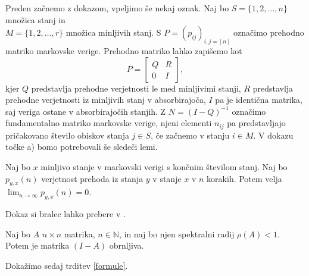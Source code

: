 \documentclass[twoside,11pt]{article}
\begin{document}
\noindent
Preden začnemo z dokazom, vpeljimo še nekaj oznak. Naj bo $S = \{1,2,\ldots,n\}$ množica stanj in \\ $M = \{1,2,\ldots,r\}$ množica minljivih stanj. S $P = (p_{ij})_{i,j=[n]}$ označimo prehodno matriko markovske verige. Prehodno matriko lahko zapišemo kot 
$$ P =
\begin{bmatrix} 
    Q & R \\
    0 & I 
\end{bmatrix},
$$
     kjer $Q$ predstavlja prehodne verjetnosti le med minljivimi stanji, $R$ predstavlja prehodne verjetnosti iz minljivih stanj v absorbirajoča, $I$ pa je identična matrika, saj veriga ostane v absorbirajočih stanjih. Z $N = (I-Q)^{-1}$ označimo fundamentalno matriko markovske verige, njeni elementi $n_{ij}$  pa predstavljajo pričakovano število obiskov stanja $j\in S$, če začnemo v stanju $i\in M$. V dokazu točke a) bomo potrebovali še sledeči lemi.  
\smallskip

\begin{lema}\label{markovske}
    Naj bo $x$ minljivo stanje v markovski verigi s končnim številom stanj. Naj bo $p_{y,x}(n)$ verjetnost prehoda iz stanja $y$ v stanje $x$ v $n$ korakih. Potem velja $\lim_{n \to \infty} p_{y,x}(n) = 0$.
\end{lema}

\noindent Dokaz si bralec lahko prebere v \cite{ver}.
\begin{lema}\label{matrike}
    Naj bo $A$ $n\times n$ matrika, $n \in \mathbb{N}$, in naj bo njen spektralni radij $\rho(A)<1$. Potem je matrika $(I-A)$ obrnljiva.
\end{lema}


\noindent Dokažimo sedaj trditev \ref{formule}. \newline
\smallskip
\end{document}
